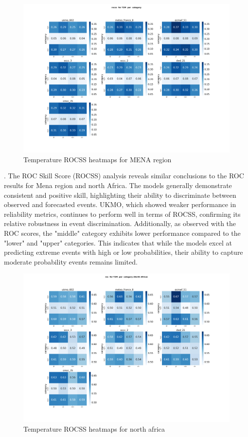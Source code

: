 \begin{figure}[H]
    \centering
    \includegraphics[width=1\linewidth]{plots/prob/rocss/rocss_T2M_category.png}
    \caption{Temperature ROCSS  heatmaps for MENA region }
\end{figure}. 
The ROC Skill Score (ROCSS) analysis reveals similar conclusions to the ROC results for Mena region and north Africa. The models generally demonstrate consistent and positive skill, highlighting their ability to discriminate between observed and forecasted events. UKMO, which showed weaker performance in reliability metrics, continues to perform well in terms of ROCSS, confirming its relative robustness in event discrimination. Additionally, as observed with the ROC scores, the "middle" category exhibits lower performance compared to the "lower" and "upper" categories. This indicates that while the models excel at predicting extreme events with high or low probabilities, their ability to capture moderate probability events remains limited.

\begin{figure}[H]
    \centering
    \includegraphics[width=1\linewidth]{plots/prob/roc/roc_T2M_category_NorthAfrica.png}
    \caption{Temperature ROCSS  heatmaps for north africa }
\end{figure}






